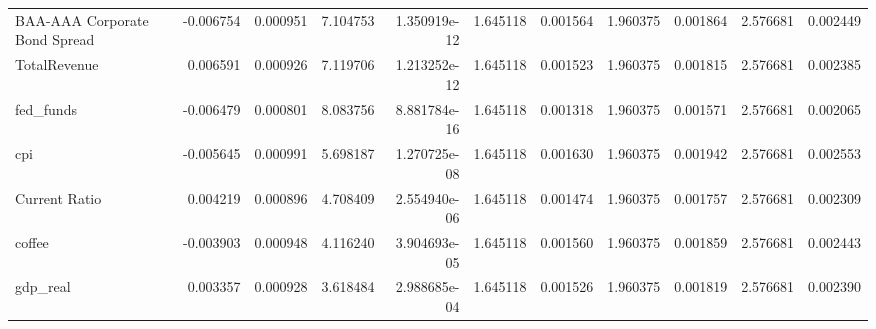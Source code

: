 \documentclass[12pt,a4paper,english]{article}
\begin{document}
{{\begin{tabular}{@{}lrrrrrrrrrr@{}}
			BAA-AAA Corporate Bond Spread  & -0.006754                & 0.000951                    & 7.104753                  & 1.350919e-12                 & 1.645118                      & 0.001564                      & 1.960375                     & 0.001864                     & 2.576681                     & 0.002449                     \\
			TotalRevenue                   & 0.006591                 & 0.000926                    & 7.119706                  & 1.213252e-12                 & 1.645118                      & 0.001523                      & 1.960375                     & 0.001815                     & 2.576681                     & 0.002385                     \\
			fed\_funds                     & -0.006479                & 0.000801                    & 8.083756                  & 8.881784e-16                 & 1.645118                      & 0.001318                      & 1.960375                     & 0.001571                     & 2.576681                     & 0.002065                     \\
			cpi                            & -0.005645                & 0.000991                    & 5.698187                  & 1.270725e-08                 & 1.645118                      & 0.001630                      & 1.960375                     & 0.001942                     & 2.576681                     & 0.002553                     \\
			Current Ratio                  & 0.004219                 & 0.000896                    & 4.708409                  & 2.554940e-06                 & 1.645118                      & 0.001474                      & 1.960375                     & 0.001757                     & 2.576681                     & 0.002309                     \\
			coffee                         & -0.003903                & 0.000948                    & 4.116240                  & 3.904693e-05                 & 1.645118                      & 0.001560                      & 1.960375                     & 0.001859                     & 2.576681                     & 0.002443                     \\
			gdp\_real                      & 0.003357                 & 0.000928                    & 3.618484                  & 2.988685e-04                 & 1.645118                      & 0.001526                      & 1.960375                     & 0.001819                     & 2.576681                     & 0.002390                     \\

\end{tabular}}}
\end{document}
